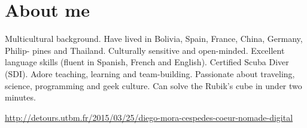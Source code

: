 \documentclass[]{friggeri-cv}
\begin{document}
\section{About me}
Multicultural background. Have lived in Bolivia, Spain, France, China, Germany, Philip-
pines and Thailand. Culturally sensitive and open-minded. Excellent language skills (fluent
in Spanish, French and English). Certified Scuba Diver (SDI). Adore teaching, learning and
team-building. Passionate about traveling, science, programming and geek culture. Can solve the Rubik's cube in under two minutes.

\href{http://detours.utbm.fr/2015/03/25/diego-mora-cespedes-coeur-nomade-digital}{http://detours.utbm.fr/2015/03/25/diego-mora-cespedes-coeur-nomade-digital}
\end{document}
